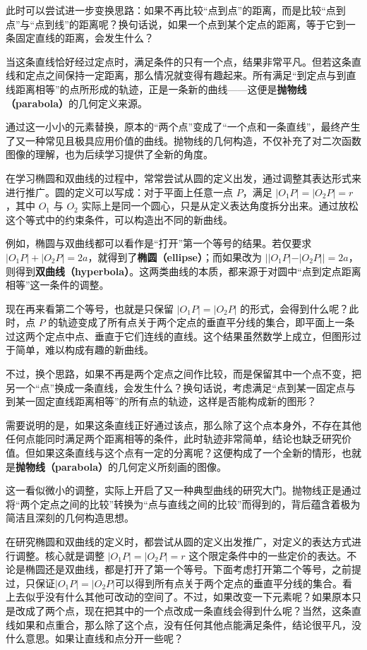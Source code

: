 此时可以尝试进一步变换思路：如果不再比较“点到点”的距离，而是比较“点到点”与“点到线”的距离呢？换句话说，如果一个点到某个定点的距离，等于它到一条固定直线的距离，会发生什么？

当这条直线恰好经过定点时，满足条件的只有一个点，结果非常平凡。但若这条直线和定点之间保持一定距离，那么情况就变得有趣起来。所有满足“到定点与到直线距离相等”的点所形成的轨迹，正是一条新的曲线——这便是\textbf{抛物线（parabola）}的几何定义来源。

通过这一小小的元素替换，原本的“两个点”变成了“一个点和一条直线”，最终产生了又一种常见且极具应用价值的曲线。抛物线的几何构造，不仅补充了对二次函数图像的理解，也为后续学习提供了全新的角度。



在学习椭圆和双曲线的过程中，常常尝试从圆的定义出发，通过调整其表达形式来进行推广。圆的定义可以写成：对于平面上任意一点 $P$，满足 $|O_1P| = |O_2P| = r$，其中 $O_1$ 与 $O_2$ 实际上是同一个圆心，只是从定义表达角度拆分出来。通过放松这个等式中的约束条件，可以构造出不同的新曲线。

例如，椭圆与双曲线都可以看作是“打开”第一个等号的结果。若仅要求 $|O_1P| + |O_2P| = 2a$，就得到了\textbf{椭圆（ellipse）}；而如果改为 $||O_1P| - |O_2P|| = 2a$，则得到\textbf{双曲线（hyperbola）}。这两类曲线的本质，都来源于对圆中“点到定点距离相等”这一条件的调整。

现在再来看第二个等号，也就是只保留 $|O_1P| = |O_2P|$ 的形式，会得到什么呢？此时，点 $P$ 的轨迹变成了所有点关于两个定点的垂直平分线的集合，即平面上一条过这两个定点中点、垂直于它们连线的直线。这个结果虽然数学上成立，但图形过于简单，难以构成有趣的新曲线。

不过，换个思路，如果不再是两个定点之间作比较，而是保留其中一个点不变，把另一个“点”换成一条直线，会发生什么？换句话说，考虑满足“点到某一固定点与到某一固定直线距离相等”的所有点的轨迹，这样是否能构成新的图形？

需要说明的是，如果这条直线正好通过该点，那么除了这个点本身外，不存在其他任何点能同时满足两个距离相等的条件，此时轨迹非常简单，结论也缺乏研究价值。但如果这条直线与这个点有一定的分离呢？这便构成了一个全新的情形，也就是\textbf{抛物线（parabola）}的几何定义所刻画的图像。

这一看似微小的调整，实际上开启了又一种典型曲线的研究大门。抛物线正是通过将“两个定点之间的比较”转换为“点与直线之间的比较”而得到的，背后蕴含着极为简洁且深刻的几何构造思想。


在研究椭圆和双曲线的定义时，都尝试从圆的定义出发推广，对定义的表达方式进行调整。核心就是调整 $|O_1P| = |O_2P| = r$ 这个限定条件中的一些定价的表达。不论是椭圆还是双曲线，都是打开了第一个等号。下面考虑打开第二个等号，之前提过，只保证$|O_1P| = |O_2P|$可以得到所有点关于两个定点的垂直平分线的集合。看上去似乎没有什么其他可改动的空间了。不过，如果改变一下元素呢？如果原本只是改成了两个点，现在把其中的一个点改成一条直线会得到什么呢？当然，这条直线如果和点重合，那么除了这个点，没有任何其他点能满足条件，结论很平凡，没什么意思。如果让直线和点分开一些呢？



